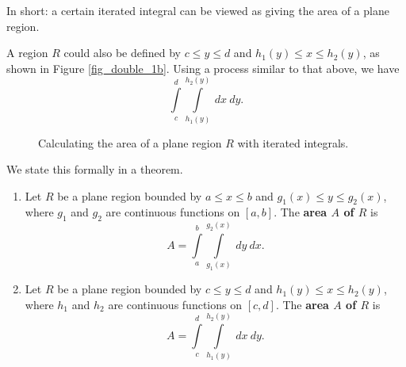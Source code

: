 In short: a certain iterated integral can be viewed as giving the area of a plane region.

A region $R$ could also be defined by $c\leq y\leq d$ and $h_1(y)\leq x\leq h_2(y)$, as shown in Figure \ref{fig_double_1b}. Using a process similar to that above, we have 
$$\int\limits_c^d\int\limits_{h_1(y)}^{h_2(y)} \ dx\ dy.$$


\begin{figure}[H]
\centering
\qquad
{}
\caption{Calculating the area of a plane region $R$ with iterated integrals. }
\end{figure}

We state this formally in a theorem.

\begin{theorem}\label{thm:area_plane_region}
\begin{enumerate}
	\item Let $R$ be a plane region bounded by $a\leq x\leq b$ and $g_1(x)\leq y\leq g_2(x)$, where $g_1$ and $g_2$ are continuous functions on $[a,b]$. The \textbf{area $A$ of $R$} is
	$$A = \int\limits_a^b\int\limits_{g_1(x)}^{g_2(x)} \ dy\ dx.$$
	\item Let $R$ be a plane region bounded by $c\leq y\leq d$ and $h_1(y)\leq x\leq h_2(y)$, where $h_1$ and $h_2$ are continuous functions on $[c,d]$. The \textbf{area $A$ of $R$} is
	$$A = \int\limits_c^d\int\limits_{h_1(y)}^{h_2(y)} \ dx\ dy.$$
\end{enumerate}
\end{theorem}

